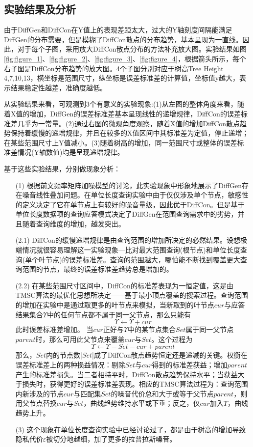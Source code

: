 \subsection{实验结果及分析}


由于DiffGen和DiffCon在Y值上的表现差距太大，过大的Y轴刻度间隔能满足DiffGen的分布需要，但是模糊了DiffCon散点的分布趋势，基本呈现为一直线。因此，对于每个子图，采用放大DiffCon散点分布的方法补充放大图。实验结果如图\ref{fig:figure_1}、\ref{fig:figure_2}、\ref{fig:figure_3}、\ref{fig:figure_4}，根据箭头所示，每个右子图是DiffCon分布趋势的放大图。4个子图分别对应于树高Tree Height = 4,7,10,13，横坐标是范围尺寸，纵坐标是误差标准差的计算值，坐标值y越大，表示结果稳定性越差，准确度越低。

从实验结果来看，可观测到3个有意义的实验现象:(1)从左图的整体角度来看，随着X值的增加，DiffGen的误差标准差基本呈现线性的递增规律，DiffCon的误差标准差几乎为一常量。(2)通过右图的微观角度观察，随着X值的增加DiffCon散点趋势保持着缓慢的递增规律，并且在较多的X值区间中其标准差为定值，停止递增；在某些范围尺寸上Y值减小。(3)随着树高的增加，同一范围尺寸或整体的误差标准差情况(Y轴数值)均是呈现递增规律。

基于这些实验结果，分别做现象分析：
\begin{enumerate}
	\item[(1)]根据前文频率矩阵加噪模型的讨论，此实验现象中形象地展示了DiffGen存在噪音线性叠加问题。在单位长度查询实验中由于仅仅涉及单个节点，敏感性的定义决定了它在单节点上有较好的噪音量级，因此优于DiffCon。但是基于单位长度数据项的查询应答模式决定了DiffGen在范围查询需求中的劣势，并且随着查询维度的增加，越发突出。
	\item[(2.1)]DiffCon的缓慢递增规律是由查询范围的增加所决定的必然结果。设想极端情况就很容易理解这一实验现象---比对最大范围查询(根节点)和单位长度查询(单个叶节点)的误差标准差。查询的范围越大，哪怕能不断找到覆盖更大查询范围的节点，最终的误差标准差趋势总是增加的。
	\item[(2.2)]在某些范围尺寸区间中，DiffCon的标准差表现为一恒定值，这是由TMSC算法的最优化思想所决定——基于最小顶点覆盖的搜索过程。查询范围的增加在实验中是通过取更多的叶节点来模拟，当新取到的叶节点$cur$与应答结果集合$\Upsilon$中的任何节点都不属于同一父节点，那么只能有
	\[
	\Upsilon \leftarrow \Upsilon + cur
	\]
	此时误差标准差增加。
	当$cur$正好与$\Upsilon$中的某节点集合$Set$属于同一父节点$parent$时，那么可用此父节点来覆盖$cur$与$Set$。这个过程为
	\[
	\Upsilon \leftarrow \Upsilon - Set - cur + parent
	\]
	那么，$Set$内的节点数|$Set$|成了DiffCon散点趋势恒定还是递减的关键。权衡在误差标准差上的两种损益情况：剔除$Set$与$cur$得到的标准差获益；增加$parent$产生的标准差损失。当二者相持平时，DiffCon散点趋势保持水平；当获益大于损失时，获得更好的误差标准差表现。相应的TMSC算法过程为：查询范围内新涉及的节点$cur$与匹配集$Set$的噪音代价总和大于或等于父节点$parent$，则用父节点替换$cur$与$Set$，曲线趋势维持水平或下垂；反之，仅$cur$加入$\Upsilon$，曲线趋势上升。
	\item[(3)]这个现象在单位长度查询实验中已经讨论过了，都是由于树高的增加导致隐私代价$\varepsilon$被切分地越细，加了更多的拉普拉斯噪音。
\end{enumerate}

